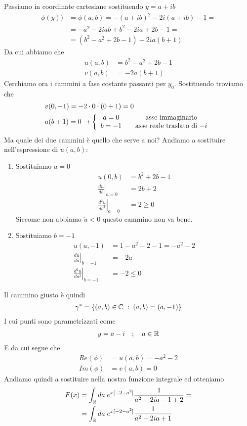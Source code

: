 Passiamo in coordinate cartesiane sostituendo $y = a+ib$
\begin{align}
	\phi(y)) &= \phi(a,b) = -(a+ib)^2 -2i(a+ib) -1 = \nonumber\\
	&= -a^2 - 2iab + b^2 - 2ia + 2b -1 =   \nonumber\\
	&= (b^2 -a^2 + 2b -1) -2ia(b + 1)
\end{align}
Da cui abbiamo che
\begin{align}
	u(a,b) &= b^2 -a^2 + 2b -1\\
	v(a,b) &= -2a(b + 1)
\end{align}
Cerchiamo ora i cammini a fase costante passanti per $y_0$. Sostituendo troviamo che
\begin{align}
	&v(0,-1) = -2\cdot 0 \cdot (0 + 1) =0\\
	&a(b + 1) = 0 \to \left\{ \begin{array}{cc} a=0 \quad &\text{asse immaginario}\\ b=-1 \quad &\text{asse reale traslato di $-i$} \end{array} \right.
\end{align}
Ma quale dei due cammini è quello che serve a noi? Andiamo a sostituire nell'espressione di $u(a,b)$:
\begin{enumerate}
	\item Sostituiamo $a=0$
	\begin{align}
		u(0,b) &= b^2 + 2b-1 \\
		\left. \frac{d u}{d b} \right|_{a=0} &= 2b + 2 \\ 
		\left. \frac{d^2 u}{d b^2} \right|_{a=0} &= 2 \geq 0  
	\end{align}
	Siccome non abbiamo $\ddot u <0$ questo cammino non va bene.
	\item Sostituiamo $b=-1$
	\begin{align}
		u(a,-1) &= 1 -a^2 -2-1 = -a^2 -2 \\
		\left. \frac{d u}{d a} \right|_{b=-1} &= -2a\\ 
		\left. \frac{d^2 u}{d a^2} \right|_{b=-1} &= -2 \leq 0  
	\end{align}
\end{enumerate}

Il cammino giusto è quindi 
\begin{align}
	\gamma^*= \left\{ (a,b) \in \mathbb{C} \; : \; (a,b) = (a,-1) \right\}
\end{align}
I cui punti sono parametrizzati come
\begin{align}
	y= a - i \quad ; \quad a \in \mathbb{R}
\end{align}
E da cui segue che
\begin{align}
	Re(\phi) &= u(a,b) = -a^2 - 2 \\
	Im (\phi) &=v(a,b) = 0
\end{align}
Andiamo quindi a sostituire nella nostra funzione integrale ed otteniamo
\begin{align}
	F(x) &= \int_{\mathbb{R}} da \; e^{x[-2-a^2]} \frac{1}{a^2 -2ia -1 + 2} =\nonumber\\
	&= \int_{\mathbb{R}} da \; e^{x[-2-a^2]} \frac{1}{a^2 -2ia +1} 
\end{align}

